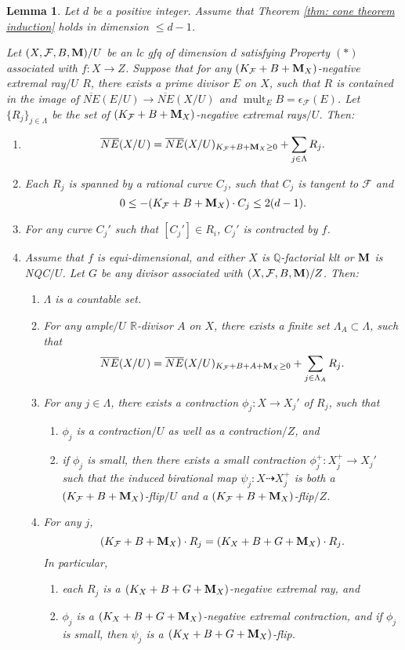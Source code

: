 \documentclass[11pt]{amsart}
\numberwithin{equation}{section}
\newcommand{\Mm}{{\bf{M}}}
\newcommand{\Qq}{\mathbb{Q}}
\newcommand{\Rr}{\mathbb{R}}
\newcommand{\mult}{\operatorname{mult}}
\newcommand{\Ff}{\mathcal{F}}
\newtheorem{lem}[thm]{Lemma}
\theoremstyle{definition}
\theoremstyle{definition}
\theoremstyle{definition}
\begin{document}
\begin{lem}\label{lem: induction cone 1}
Let $d$ be a positive integer. Assume that Theorem \ref{thm: cone theorem induction} holds in dimension $\leq d-1$.

Let $(X,\Ff,B,\Mm)/U$ be an lc gfq of dimension $d$ satisfying Property $(*)$ associated with $f: X\rightarrow Z$. Suppose that for any $(K_{\Ff}+B+\Mm_X)$-negative extremal ray$/U$ $R$, there exists a prime divisor $E$ on $X$, such that $R$ is contained in the image of $\overline{NE}(E/U)\rightarrow\overline{NE}(X/U)$ and $\mult_EB=\epsilon_{\Ff}(E)$. Let $\{R_j\}_{j\in\Lambda}$ be the set of $(K_{\Ff}+B+\Mm_X)$-negative extremal rays$/U$. Then:
\begin{enumerate}
    \item $$\overline{NE}(X/U)=\overline{NE}(X/U)_{K_{\Ff}+B+\Mm_X\geq 0}+\sum_{j\in\Lambda} R_j.$$
  \item Each $R_j$ is spanned by a rational curve $C_j$, such that $C_j$ is tangent to $\Ff$ and $$0\leq -(K_{\Ff}+B+\Mm_X)\cdot C_j\leq 2(d-1).$$
  \item For any curve $C_j'$ such that $[C_j']\in R_i$, $C_j'$ is contracted by $f$.
  \item Assume that $f$ is equi-dimensional, and either $X$ is $\Qq$-factorial klt or $\Mm$ is NQC$/U$. Let $G$ be any divisor associated with $(X,\Ff,B,\Mm)/Z$. Then:
\begin{enumerate}
    \item $\Lambda$ is a countable set.
    \item For any ample$/U$ $\Rr$-divisor $A$ on $X$, there exists a finite set $\Lambda_A\subset\Lambda$, such that
    $$\overline{NE}(X/U)=\overline{NE}(X/U)_{K_{\Ff}+B+A+\Mm_X\geq 0}+\sum_{j\in\Lambda_A}R_j.$$
    \item For any $j\in\Lambda$, there exists a contraction $\phi_j: X\rightarrow X_j'$ of $R_j$, such that 
    \begin{enumerate}
    \item $\phi_j$ is a contraction$/U$ as well as a contraction$/Z$, and
    \item if $\phi_j$ is small, then there exists a small contraction $\phi_j^+: X_j^+\rightarrow X_j'$ such that the induced birational map $\psi_j: X\dashrightarrow X_j^+$ is both a $(K_{\Ff}+B+\Mm_X)$-flip$/U$ and a $(K_{\Ff}+B+\Mm_X)$-flip$/Z$.
    \end{enumerate}
    \item For any $j$,
    $$(K_{\Ff}+B+\Mm_X)\cdot R_j=(K_X+B+G+\Mm_X)\cdot R_j.$$
    In particular,
    \begin{enumerate}
        \item each $R_j$ is a $(K_X+B+G+\Mm_X)$-negative extremal ray, and
        \item $\phi_j$ is a $(K_X+B+G+\Mm_X)$-negative extremal contraction, and if $\phi_j$ is small, then $\psi_j$ is a $(K_X+B+G+\Mm_X)$-flip.
    \end{enumerate}
\end{enumerate}
\end{enumerate}
\end{lem}
\end{document}
